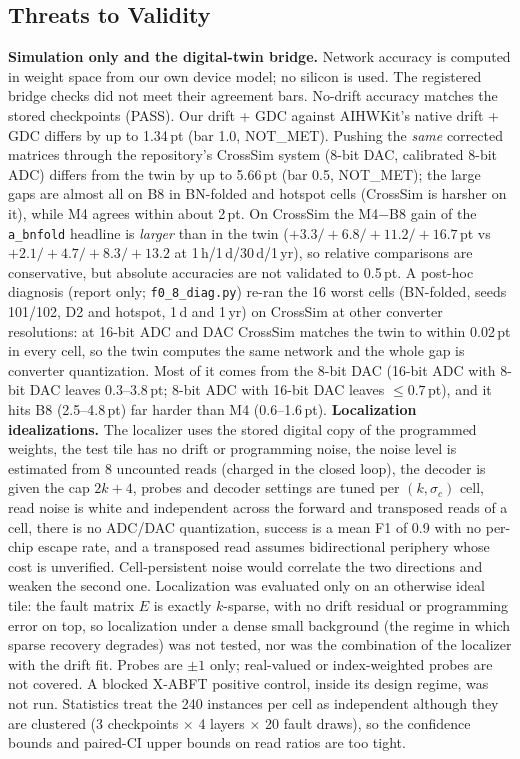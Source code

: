 \documentclass[journal]{IEEEtran}
\newcommand{\mfour}{\textsc{M4}}
\newcommand{\bviii}{\textsc{B8}}
\newcommand{\pt}{\,pt}
\begin{document}
\subsection{Threats to Validity}
\label{sec:threats}
\textbf{Simulation only and the digital-twin bridge.} Network accuracy is computed in weight space from our own device model; no silicon is used.
The registered bridge checks did not meet their agreement bars. No-drift accuracy matches the stored checkpoints (PASS). Our drift + GDC against AIHWKit's native drift + GDC differs by up to 1.34\pt{} (bar 1.0, NOT\_MET). Pushing the \emph{same} corrected matrices through the repository's CrossSim system (8-bit DAC, calibrated 8-bit ADC) differs from the twin by up to 5.66\pt{} (bar 0.5, NOT\_MET); the large gaps are almost all on \bviii{} in BN-folded and hotspot cells (CrossSim is harsher on it), while \mfour{} agrees within about 2\pt.
On CrossSim the \mfour{}$-$\bviii{} gain of the \texttt{a\_bnfold} headline is \emph{larger} than in the twin ($+3.3/+6.8/+11.2/+16.7$\pt{} vs $+2.1/+4.7/+8.3/+13.2$ at 1\,h/1\,d/30\,d/1\,yr), so relative comparisons are conservative, but absolute accuracies are not validated to 0.5\pt.
A post-hoc diagnosis (report only; \texttt{f0\_8\_diag.py}) re-ran the 16 worst cells (BN-folded, seeds 101/102, D2 and hotspot, 1\,d and 1\,yr) on CrossSim at other converter resolutions: at 16-bit ADC and DAC CrossSim matches the twin to within 0.02\pt{} in every cell, so the twin computes the same network and the whole gap is converter quantization. Most of it comes from the 8-bit DAC (16-bit ADC with 8-bit DAC leaves 0.3--3.8\pt; 8-bit ADC with 16-bit DAC leaves $\le0.7$\pt), and it hits \bviii{} (2.5--4.8\pt) far harder than \mfour{} (0.6--1.6\pt).
\textbf{Localization idealizations.} The localizer uses the stored digital copy of the programmed weights, the test tile has no drift or programming noise, the noise level is estimated from 8 uncounted reads (charged in the closed loop), the decoder is given the cap $2k+4$, probes and decoder settings are tuned per $(k,\sigma_c)$ cell, read noise is white and independent across the forward and transposed reads of a cell, there is no ADC/DAC quantization, success is a mean F1 of 0.9 with no per-chip escape rate, and a transposed read assumes bidirectional periphery whose cost is unverified. Cell-persistent noise would correlate the two directions and weaken the second one. Localization was evaluated only on an otherwise ideal tile: the fault matrix $E$ is exactly $k$-sparse, with no drift residual or programming error on top, so localization under a dense small background (the regime in which sparse recovery degrades) was not tested, nor was the combination of the localizer with the drift fit. Probes are $\pm1$ only; real-valued or index-weighted probes are not covered. A blocked X-ABFT positive control, inside its design regime, was not run. Statistics treat the 240 instances per cell as independent although they are clustered (3 checkpoints $\times$ 4 layers $\times$ 20 fault draws), so the confidence bounds and paired-CI upper bounds on read ratios are too tight.
\end{document}
